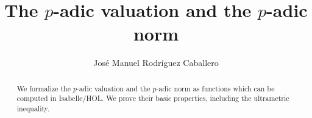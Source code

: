 \documentclass[11pt,a4paper]{article}
\begin{document}
\title{The $p$-adic valuation and the $p$-adic norm}
\author{Jos\'e Manuel Rodr\'iguez Caballero}
\maketitle

\begin{abstract}
We formalize the $p$-adic valuation and the $p$-adic norm as functions which can be computed in Isabelle/HOL. We prove their basic properties, including the ultrametric inequality.
\end{abstract}

\tableofcontents






\end{document}
